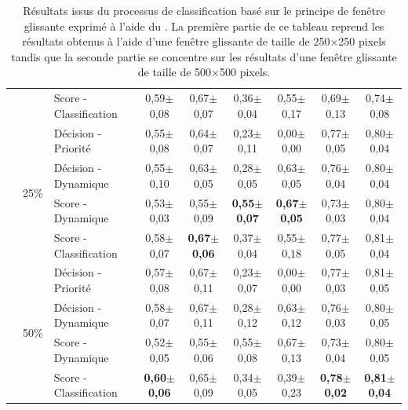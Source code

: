 \begin{landscape}
\begin{table}[p]
\begin{tabular}{lllcccccc}
							        &                               & Score - Classification    & 0,59$\pm$0,08         & 0,67$\pm$0,07         & 0,36$\pm$0,04         & 0,55$\pm$0,17         & 0,69$\pm$0,13         & 0,74$\pm$0,08         \\ \cline{2-9}
							        & \multirow{4}{*}{25\%}         & Décision - Priorité       & 0,55$\pm$0,08         & 0,64$\pm$0,07         & 0,23$\pm$0,11         & 0,00$\pm$0,00         & 0,77$\pm$0,05         & 0,80$\pm$0,04         \\
							        &                               & Décision - Dynamique      & 0,55$\pm$0,10         & 0,63$\pm$0,05         & 0,28$\pm$0,05         & 0,63$\pm$0,05         & 0,76$\pm$0,04         & 0,80$\pm$0,04         \\
							        &                               & Score - Dynamique         & 0,53$\pm$0,03         & 0,55$\pm$0,09         & \textbf{0,55$\pm$0,07}& \textbf{0,67$\pm$0,05}& 0,73$\pm$0,03         & 0,80$\pm$0,04         \\
							        &                               & Score - Classification    & 0,58$\pm$0,07         & \textbf{0,67$\pm$0,06}& 0,37$\pm$0,04         & 0,55$\pm$0,18         & 0,77$\pm$0,05         & 0,81$\pm$0,04         \\ \cline{2-9}
							        & \multirow{4}{*}{50\%}         & Décision - Priorité       & 0,57$\pm$0,08         & 0,67$\pm$0,11         & 0,23$\pm$0,07         & 0,00$\pm$0,00         & 0,77$\pm$0,03         & 0,81$\pm$0,05         \\
							        &                               & Décision - Dynamique      & 0,58$\pm$0,07         & 0,67$\pm$0,11         & 0,28$\pm$0,12         & 0,63$\pm$0,12         & 0,76$\pm$0,03         & 0,80$\pm$0,05         \\
							        &                               & Score - Dynamique         & 0,52$\pm$0,05         & 0,55$\pm$0,06         & 0,55$\pm$0,08         & 0,67$\pm$0,13         & 0,73$\pm$0,04         & 0,80$\pm$0,05         \\ \rowcolor[HTML]{E7E6E6}
		                            &                               & Score - Classification    & \textbf{0,60$\pm$0,06}& 0,65$\pm$0,09         & 0,34$\pm$0,05         & 0,39$\pm$0,23         & \textbf{0,78$\pm$0,02}& \textbf{0,81$\pm$0,04}\\
		\bottomrule
    \end{tabular}
    \caption{Résultats issus du processus de classification basé sur le principe de fenêtre glissante exprimé à l'aide du \fscore. La première partie de ce tableau reprend les résultats obtenus à l'aide d'une fenêtre glissante de taille de 250$\times$250 pixels tandis que la seconde partie se concentre sur les résultats d'une fenêtre glissante de taille de 500$\times$500 pixels.}
    \label{tab:results_image_improvement_sliding_window}
\end{table}
\end{landscape}

